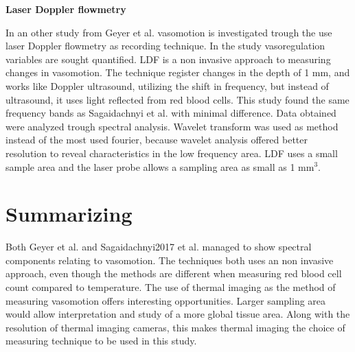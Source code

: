 \textbf{Laser Doppler flowmetry}

In an other study from Geyer et al. vasomotion is investigated trough the use laser Doppler flowmetry as recording technique. In the study vasoregulation variables are sought quantified. LDF is a non invasive approach to measuring changes in vasomotion. The technique register changes in the depth of 1 mm, and works like Doppler ultrasound, utilizing the shift in frequency, but instead of ultrasound, it uses light reflected from red blood cells. This study found the same frequency bands as Sagaidachnyi et al. with minimal difference. Data obtained were analyzed trough spectral analysis. Wavelet transform was used as method instead of the most used fourier, because wavelet analysis offered better resolution to reveal characteristics in the low frequency area.\cite{geyer2004}
LDF uses a small sample area and the laser probe allows a sampling area as small as 1 mm$^3$.\cite{brothers2010} 

  
\section{Summarizing}

Both Geyer et al. and Sagaidachnyi2017 et al. managed to show spectral components relating to vasomotion. The techniques both uses an non invasive approach, even though the methods are different when measuring red blood cell count compared to temperature. The use of thermal imaging as the method of measuring vasomotion offers interesting opportunities. Larger sampling area would allow interpretation and study of a more global tissue area. Along with the resolution of thermal imaging cameras, this makes thermal imaging the choice of measuring technique to be used in this study. 


